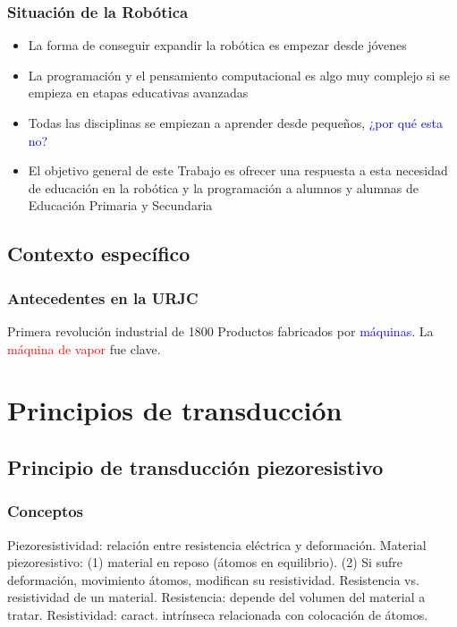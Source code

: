 \documentclass{beamer}
\begin{document}
\begin{frame}
\frametitle{Situación de la Robótica}
\begin{itemize}
\item {}La forma de conseguir expandir la robótica es empezar desde jóvenes
\item {}La programación y el pensamiento computacional es algo muy complejo si se empieza en etapas educativas avanzadas
\item {}Todas las disciplinas se empiezan a aprender desde pequeños, \textcolor{blue}{¿por qué esta no?}



\item {}El objetivo general de este Trabajo es ofrecer una respuesta a esta necesidad de educación en la robótica y la programación a alumnos y alumnas de Educación Primaria y Secundaria
\end{itemize}
\end{frame}

\subsection{Contexto específico}
\begin{frame}
\frametitle{Antecedentes en la URJC}
\begin{block}{Primera revolución industrial de 1800}
Productos fabricados por \textcolor{blue}{máquinas}. La \textcolor{red}{máquina de vapor} fue clave.
\end{block}
\end{frame}

\section{Principios de transducción}
\subsection{Principio de transducción piezoresistivo}
\begin{frame}
\frametitle{Conceptos}
\begin{outline}
\1 Piezoresistividad: relación entre resistencia eléctrica y deformación.
\2 Material piezoresistivo: (1) material en reposo (átomos en equilibrio).
\3 (2) Si sufre deformación, movimiento átomos, modifican su resistividad.
\2 Resistencia vs. resistividad de un material.
\3 Resistencia: depende del volumen del material a tratar.
\3 Resistividad: caract. intrínseca relacionada con colocación de átomos.
\end{outline}
\end{frame}
\end{document}
